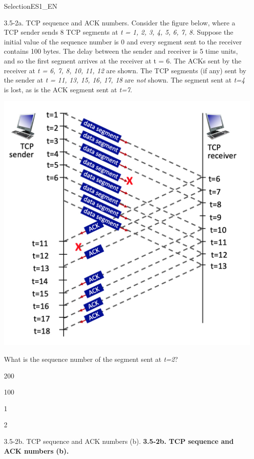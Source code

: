 \documentclass[a4paper]{article}
\begin{document}
\begin{quiz}{SelectionES1\_EN}
\begin{multi}[points=1,shuffle]{3.5-2a. TCP sequence and ACK numbers.}
Consider the figure below, where a TCP sender sends 8 TCP segments at \emph{t = 1, 2, 3, 4, 5, 6, 7, 8.} Suppose the initial value of the sequence number is 0 and every segment sent to the receiver contains 100 bytes. The delay between the sender and receiver is 5 time units, and so the first segment arrives at the receiver at t = 6. The ACKs sent by the receiver at \emph{t = 6, 7, 8, 10, 11, 12} are shown. The TCP segments (if any) sent by the sender at \emph{t = 11, 13, 15, 16, 17, 18} are \emph{not} shown. The segment sent at \emph{t=4} is lost, as is the ACK segment sent at \emph{t=7}. 
\begin{center}
\includegraphics[width=\linewidth]{figs/tcp_seq_ack_1.jpg}
\end{center}

 What is the sequence number of the segment sent at \emph{t=2}?
\item 200
\item* 100
\item 1
\item 2
\end{multi}

\begin{multi}[points=1,shuffle]{3.5-2b. TCP sequence and ACK numbers (b).}
\textbf{3.5-2b. TCP sequence and ACK numbers (b). }


\end{multi}
\end{quiz}
\end{document}
